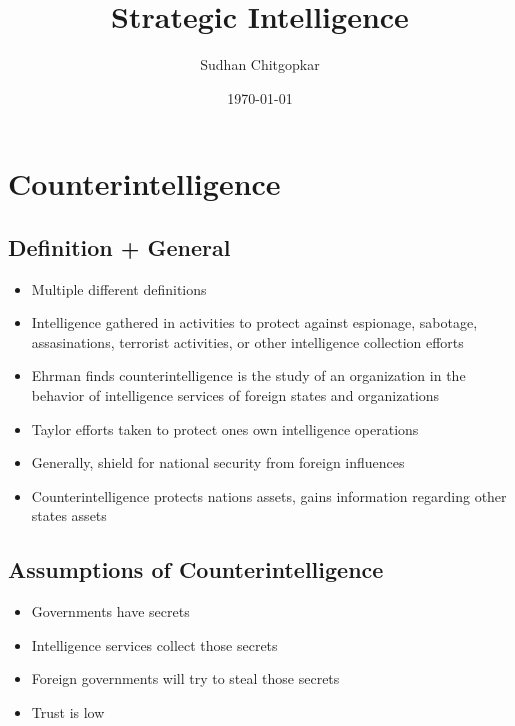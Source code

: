\documentclass[11pt]{article}
\author{Sudhan Chitgopkar}
\date{\today}
\title{Strategic Intelligence}
\begin{document}
\maketitle
\tableofcontents \clearpage\section{Counterintelligence}
\label{sec:org4860557}
\subsection{Definition + General}
\label{sec:org28a8210}
\begin{itemize}
\item Multiple different definitions
\item Intelligence gathered in activities to protect against espionage, sabotage, assasinations, terrorist activities, or other intelligence collection efforts
\item Ehrman finds counterintelligence is the study of an organization in the behavior of intelligence services of foreign states and organizations
\item Taylor efforts taken to protect ones own intelligence operations
\item Generally, shield for national security from foreign influences
\item Counterintelligence protects nations assets, gains information regarding other states assets
\end{itemize}
\subsection{Assumptions of Counterintelligence}
\label{sec:orgd5f7a7d}
\begin{itemize}
\item Governments have secrets
\item Intelligence services collect those secrets
\item Foreign governments will try to steal those secrets
\item Trust is low
\end{itemize}
\end{document}
